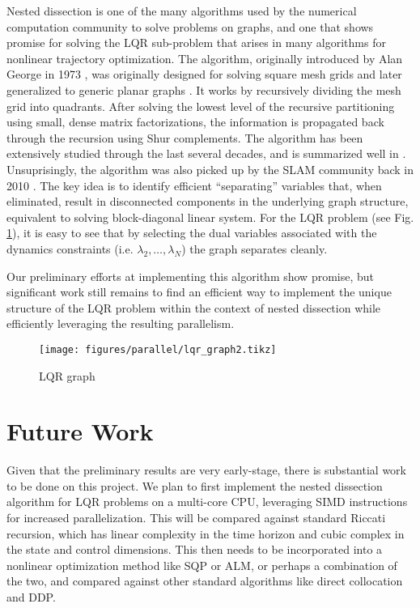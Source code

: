 \documentclass[../root.tex]{subfiles}
\begin{document}
Nested dissection is one of the many algorithms used by the numerical
computation community to solve problems on graphs, and one that shows promise
for solving the LQR sub-problem that arises in many algorithms for nonlinear
trajectory optimization. The algorithm, originally introduced by Alan George
in 1973 \cite{george_Nested_1973}, was originally designed for solving square
mesh grids and later generalized to generic planar graphs
\cite{lipton_Generalized_1979}. It works by recursively dividing the mesh grid
into quadrants. After solving the lowest level of the recursive partitioning
using small, dense matrix factorizations, the information is propagated back
through the recursion using Shur complements. The algorithm has been
extensively studied through the last several decades, and is summarized well
in \cite{khaira_Nested_}. Unsuprisingly, the algorithm was also picked up by
the SLAM community back in 2010 \cite{ni_Multilevel_2010}. The key idea is to
identify efficient ``separating'' variables that, when eliminated, result in
disconnected components in the underlying graph structure, equivalent to
solving block-diagonal linear system. For the LQR problem (see Fig.
\ref{fig:LQR_graph}), it is easy to see that by selecting the dual variables
associated with the dynamics constraints (i.e. $\lambda_2, \dots, \lambda_N$) the
graph separates cleanly.

Our preliminary efforts at implementing this algorithm show promise, but significant work
still remains to find an efficient way to implement the unique structure of the LQR problem
within the context of nested dissection while efficiently leveraging the resulting 
parallelism. 

\begin{figure}
    \centering
    \texttt{[image: figures/parallel/lqr\_graph2.tikz]}
    \caption{LQR graph}
    \label{fig:LQR_graph}
\end{figure}

\section{Future Work}

Given that the preliminary results are very early-stage, there is substantial work to 
be done on this project. We plan to first implement the nested dissection algorithm for 
LQR problems on a multi-core CPU, leveraging SIMD instructions for increased parallelization.
This will be compared against standard Riccati recursion, which has linear complexity 
in the time horizon and cubic complex in the state and control dimensions. This then 
needs to be incorporated into a nonlinear optimization method like SQP or ALM, or perhaps
a combination of the two, and compared against other standard algorithms like direct 
collocation and DDP.
\end{document}
